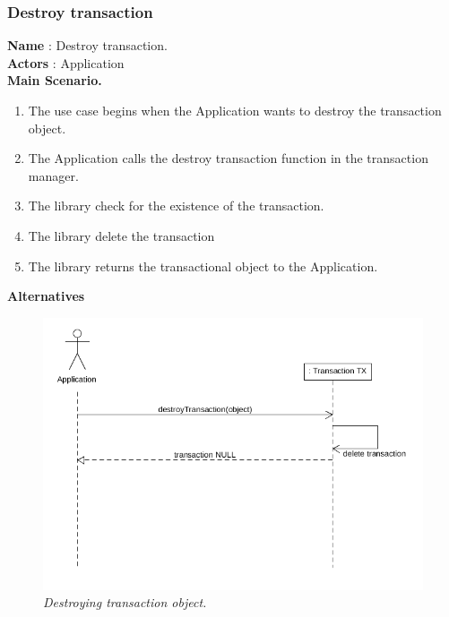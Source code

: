 \documentclass[12pt]{article}
\begin{document}
{\subsubsection{Destroy transaction}
\textbf{Name} : Destroy transaction.\\
\textbf{Actors} : Application\\
\textbf{Main Scenario.}
\begin{enumerate}
  \item The use case begins when the Application wants to destroy the transaction object.
  \item The Application calls the destroy transaction function in the transaction manager.
  \item The library check for the existence of the transaction.
  \item The library delete the transaction  
  \item The library returns the transactional object to the Application.
\end{enumerate}
\textbf{Alternatives}\\

\begin{figure}[h!]
\centering
\includegraphics[scale=0.5]{Pictures/destroy.png}
\caption{\textit{\color{gray}Destroying transaction object.}}
\end{figure}

}
\end{document}
